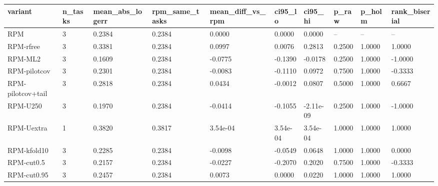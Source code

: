 \begin{tabular}{llllllllll}
\hline
variant & n\_tasks & mean\_abs\_logerr & rpm\_same\_tasks & mean\_diff\_vs\_rpm & ci95\_lo & ci95\_hi & p\_raw & p\_holm & rank\_biserial \\
\hline
RPM & 3 & 0.2384 & 0.2384 & 0.0000 & 0.0000 & 0.0000 & – & – & – \\
RPM-rfree & 3 & 0.3381 & 0.2384 & 0.0997 & 0.0076 & 0.2813 & 0.2500 & 1.0000 & 1.0000 \\
RPM-ML2 & 3 & 0.1609 & 0.2384 & -0.0775 & -0.1390 & -0.0178 & 0.2500 & 1.0000 & -1.0000 \\
RPM-pilotcov & 3 & 0.2301 & 0.2384 & -0.0083 & -0.1110 & 0.0972 & 0.7500 & 1.0000 & -0.3333 \\
RPM-pilotcov+tail & 3 & 0.2818 & 0.2384 & 0.0434 & -0.0012 & 0.0807 & 0.5000 & 1.0000 & 0.6667 \\
RPM-U250 & 3 & 0.1970 & 0.2384 & -0.0414 & -0.1055 & -2.11e-09 & 0.2500 & 1.0000 & -1.0000 \\
RPM-Uextra & 1 & 0.3820 & 0.3817 & 3.54e-04 & 3.54e-04 & 3.54e-04 & 1.0000 & 1.0000 & 1.0000 \\
RPM-kfold10 & 3 & 0.2285 & 0.2384 & -0.0098 & -0.0549 & 0.0648 & 1.0000 & 1.0000 & 0.0000 \\
RPM-cut0.5 & 3 & 0.2157 & 0.2384 & -0.0227 & -0.2070 & 0.2020 & 0.7500 & 1.0000 & -0.3333 \\
RPM-cut0.95 & 3 & 0.2457 & 0.2384 & 0.0073 & 0.0000 & 0.0220 & 1.0000 & 1.0000 & 1.0000 \\
\hline
\end{tabular}

